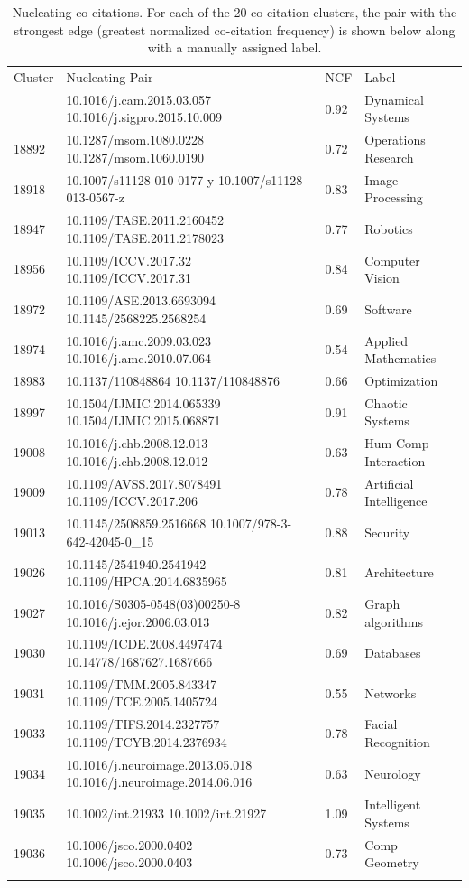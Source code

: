 \begin{table}[ht]
\caption{Nucleating co-citations. For each of the 20 co-citation clusters, the pair with the strongest edge (greatest normalized co-citation frequency) is shown below along with a manually assigned label.}
\label{tab:centroid}       
\begin{tabular}{p{8 mm}p{42 mm}ll}
\hline\noalign{\smallskip}
Cluster & Nucleating Pair & NCF & Label \\
\noalign{\smallskip}\hline
18670 & 10.1016/j.cam.2015.03.057 10.1016/j.sigpro.2015.10.009 & 0.92 & Dynamical Systems \\
18892 & 10.1287/msom.1080.0228 10.1287/msom.1060.0190 & 0.72 & Operations Research\\ 
18918 & 10.1007/s11128-010-0177-y 10.1007/s11128-013-0567-z & 0.83 & Image Processing\\ 
18947 & 10.1109/TASE.2011.2160452 10.1109/TASE.2011.2178023 & 0.77 & Robotics\\ 
18956 & 10.1109/ICCV.2017.32 10.1109/ICCV.2017.31 & 0.84 & Computer Vision\\ 
18972 & 10.1109/ASE.2013.6693094 10.1145/2568225.2568254 & 0.69 & Software \\ 
18974 & 10.1016/j.amc.2009.03.023 10.1016/j.amc.2010.07.064 & 0.54 & Applied Mathematics\\ 
18983 & 10.1137/110848864 10.1137/110848876 & 0.66 & Optimization\\ 
18997 & 10.1504/IJMIC.2014.065339 10.1504/IJMIC.2015.068871 & 0.91 & Chaotic Systems \\ 
19008 & 10.1016/j.chb.2008.12.013 10.1016/j.chb.2008.12.012 & 0.63 & Hum Comp Interaction\\ 
19009 & 10.1109/AVSS.2017.8078491 10.1109/ICCV.2017.206 & 0.78 & Artificial Intelligence\\ 
19013 & 10.1145/2508859.2516668 10.1007/978-3-642-42045-0\_15 & 0.88 & Security\\ 
19026 & 10.1145/2541940.2541942 10.1109/HPCA.2014.6835965 & 0.81 & Architecture\\ 
19027 & 10.1016/S0305-0548(03)00250-8 10.1016/j.ejor.2006.03.013 & 0.82 & Graph algorithms\\ 
19030 & 10.1109/ICDE.2008.4497474 10.14778/1687627.1687666 & 0.69 & Databases \\ 
19031 & 10.1109/TMM.2005.843347 10.1109/TCE.2005.1405724 & 0.55 & Networks\\ 
19033 & 10.1109/TIFS.2014.2327757 10.1109/TCYB.2014.2376934 & 0.78 & Facial Recognition\\ 
19034 & 10.1016/j.neuroimage.2013.05.018 10.1016/j.neuroimage.2014.06.016 & 0.63 & Neurology\\ 
19035 & 10.1002/int.21933 10.1002/int.21927 & 1.09 & Intelligent Systems\\ 
19036 & 10.1006/jsco.2000.0402 10.1006/jsco.2000.0403 & 0.73 & Comp Geometry\\ 
\noalign{\smallskip}\hline
\end{tabular}
\end{table}
\newpage

